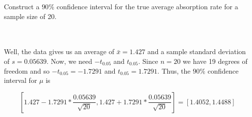 Construct a $90\%$ confidence interval for the true average absorption rate for a sample size of 20.\\\\

\begin{solution}\renewcommand{\qedsymbol}{}\ \\
    Well, the data gives us an average of $\bar{x}=1.427$ and a sample standard deviation of
    $s=0.05639$. Now, we need $-t_{0.05}$ and $t_{0.05}$. Since $n=20$ we have 19 degrees of freedom and
    so $-t_{0.05}=-1.7291$ and $t_{0.05}=1.7291$. Thus, the $90\%$ confidence interval for $\mu$ is

    $$[1.427-1.7291*\frac{0.05639}{\sqrt{20}},1.427+1.7291*\frac{0.05639}{\sqrt{20}}]=[1.4052,1.4488]$$

\end{solution}